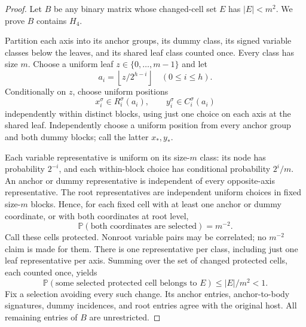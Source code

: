 \documentclass[11pt,a4paper]{article}
\theoremstyle{remark}
\newcommand{\Hfour}{H_4}
\begin{document}
\begin{proof}
Let \(B\) be any binary matrix whose changed-cell set \(E\) has
\(|E|<m^2\). We prove \(B\) contains \(\Hfour\).

Partition each axis into its anchor groups, its dummy class, its
signed variable classes below the leaves, and its shared leaf class
counted once. Every class has size \(m\).
Choose a uniform leaf \(z\in\{0,\ldots,m-1\}\) and let
\[
a_i=\left\lfloor z/2^{h-i}\right\rfloor\quad(0\le i\le h).
\]
Conditionally on \(z\), choose uniform positions
\[
x_i^\sigma\in R_i^\sigma(a_i),\qquad
y_i^\sigma\in C_i^\sigma(a_i)
\]
independently within distinct blocks, using just one choice on each
axis at the shared leaf. Independently choose a uniform position
from every anchor group and both dummy blocks; call the latter
\(x_*,y_*\).

Each variable representative is uniform on its size-\(m\) class:
its node has probability \(2^{-i}\), and each within-block choice
has conditional probability \(2^i/m\). An anchor or dummy
representative is independent of every opposite-axis representative.
The root representatives are independent uniform choices in fixed
size-\(m\) blocks. Hence, for each fixed cell with at least one
anchor or dummy coordinate, or with both coordinates at root level,
\[
\mathbb P(\text{both coordinates are selected})=m^{-2}.
\]
Call these cells protected. Nonroot variable pairs may be correlated;
no \(m^{-2}\) claim is made for them.
There is one representative per class, including just one leaf
representative per axis. Summing over the set of changed protected
cells, each counted once, yields
\[
\mathbb P(\text{some selected protected cell belongs to }E)
\le |E|/m^2<1.
\]
Fix a selection avoiding every such change. Its anchor entries,
anchor-to-body signatures, dummy incidences, and root entries agree
with the original host. All remaining entries of \(B\) are unrestricted.


\end{proof}
\end{document}
